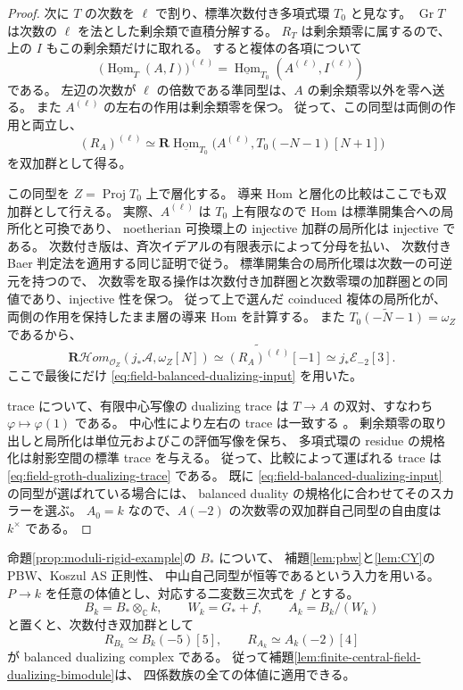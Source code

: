 \begin{proof}
次に $T$ の次数を $\ell$ で割り、標準次数付き多項式環 $T_0$ と見なす。
$\operatorname{Gr}T$ は次数の $\ell$ を法とした剰余類で直積分解する。
$R_T$ は剰余類零に属するので、上の $I$ もこの剰余類だけに取れる。
すると複体の各項について
\[
 \bigl(\underline{\operatorname{Hom}}_T(A,I)\bigr)^{(\ell)}
 =\underline{\operatorname{Hom}}_{T_0}
      (A^{(\ell)},I^{(\ell)})
\]
である。
左辺の次数が $\ell$ の倍数である準同型は、$A$ の剰余類零以外を零へ送る。
また $A^{(\ell)}$ の左右の作用は剰余類零を保つ。
従って、この同型は両側の作用と両立し、
\begin{equation}\label{eq:field-veronese-duality}
 (R_A)^{(\ell)}\simeq
 \mathbf R\underline{\operatorname{Hom}}_{T_0}
 \bigl(A^{(\ell)},T_0(-N-1)[N+1]\bigr)
\end{equation}
を双加群として得る。

この同型を $Z=\operatorname{Proj}T_0$ 上で層化する。
導来 Hom と層化の比較はここでも双加群として行える。
実際、$A^{(\ell)}$ は $T_0$ 上有限なので Hom は標準開集合への局所化と可換であり、
noetherian 可換環上の injective 加群の局所化は injective である。
次数付き版は、斉次イデアルの有限表示によって分母を払い、
次数付き Baer 判定法を適用する同じ証明で従う。
標準開集合の局所化環は次数一の可逆元を持つので、
次数零を取る操作は次数付き加群圏と次数零環の加群圏との同値であり、injective 性を保つ。
従って上で選んだ coinduced 複体の局所化が、
両側の作用を保持したまま層の導来 Hom を計算する。
また $\widetilde{T_0(-N-1)}=\omega_Z$ であるから、
\[
 \mathbf R\mathcal Hom_{\mathcal O_Z}
       (j_*\mathscr A,\omega_Z[N])
 \simeq \widetilde{(R_A)^{(\ell)}}[-1]
 \simeq j_*\mathscr E_{-2}[3].
\]
ここで最後にだけ \eqref{eq:field-balanced-dualizing-input} を用いた。

trace について、有限中心写像の dualizing trace は
$T\to A$ の双対、すなわち $\varphi\mapsto\varphi(1)$ である。
中心性により左右の trace は一致する
\cite[Remark~5.7]{YekutieliBalanced}。
剰余類零の取り出しと局所化は単位元およびこの評価写像を保ち、
多項式環の residue の規格化は射影空間の標準 trace を与える。
従って、比較によって運ばれる trace は
\eqref{eq:field-groth-dualizing-trace} である。
既に \eqref{eq:field-balanced-dualizing-input} の同型が選ばれている場合には、
balanced duality の規格化に合わせてそのスカラーを選ぶ。
$A_0=k$ なので、$A(-2)$ の次数零の双加群自己同型の自由度は $k^\times$ である。
\end{proof}

\begin{corollary}
\label{cor:four-parameter-field-dualizing}
命題\ref{prop:moduli-rigid-example}の $B_*$ について、
補題\ref{lem:pbw}と\ref{lem:CY}の PBW、Koszul AS 正則性、
中山自己同型が恒等であるという入力を用いる。
$P\to k$ を任意の体値とし、対応する二変数三次式を $f$ とする。
\[
 B_k=B_*\otimes_{\mathbb C}k,\qquad
 W_k=G_*+f,\qquad A_k=B_k/(W_k)
\]
と置くと、次数付き双加群として
\[
 R_{B_k}\simeq B_k(-5)[5],\qquad
 R_{A_k}\simeq A_k(-2)[4]
\]
が balanced dualizing complex である。
従って補題\ref{lem:finite-central-field-dualizing-bimodule}は、
四係数族の全ての体値に適用できる。
\end{corollary}

